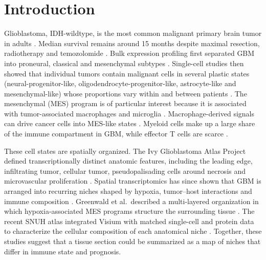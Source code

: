 \documentclass[11pt,letterpaper]{article}
\begin{document}
\section{Introduction}

Glioblastoma, IDH-wildtype, is the most common malignant primary brain tumor in adults \cite{ostrom2023,louis2021}. Median survival remains around 15 months despite maximal resection, radiotherapy and temozolomide \cite{stupp2005}. Bulk expression profiling first separated GBM into proneural, classical and mesenchymal subtypes \cite{verhaak2010,tcga2008}. Single-cell studies then showed that individual tumors contain malignant cells in several plastic states (neural-progenitor-like, oligodendrocyte-progenitor-like, astrocyte-like and mesenchymal-like) whose proportions vary within and between patients \cite{neftel2019}. The mesenchymal (MES) program is of particular interest because it is associated with tumor-associated macrophages and microglia \cite{wang2017}. Macrophage-derived signals can drive cancer cells into MES-like states \cite{hara2021}. Myeloid cells make up a large share of the immune compartment in GBM, while effector T cells are scarce \cite{klemm2020,pomboantunes2021,khan2023,decordova2020,lin2024}.

These cell states are spatially organized. The Ivy Glioblastoma Atlas Project defined transcriptionally distinct anatomic features, including the leading edge, infiltrating tumor, cellular tumor, pseudopalisading cells around necrosis and microvascular proliferation \cite{puchalski2018}. Spatial transcriptomics \cite{stahl2016,moses2022} has since shown that GBM is arranged into recurring niches shaped by hypoxia, tumor--host interactions and immune composition \cite{ravi2022,greenwald2024,ruizmoreno2025}. Greenwald et al.\ described a multi-layered organization in which hypoxia-associated MES programs structure the surrounding tissue \cite{greenwald2024}. The recent SNUH atlas integrated Visium with matched single-cell and protein data to characterize the cellular composition of each anatomical niche \cite{park2026}. Together, these studies suggest that a tissue section could be summarized as a map of niches that differ in immune state and prognosis.
\end{document}

